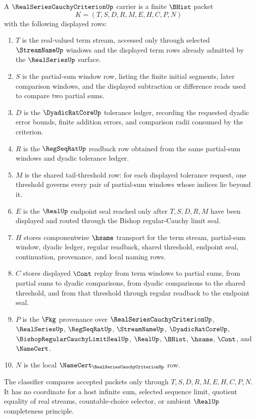 \begin{definition}\label{def:real-series-cauchy-criterion-carrier}
A $\RealSeriesCauchyCriterionUp$ carrier is a finite $\BHist$ packet
$$
K=(T,S,D,R,M,E,H,C,P,N)
$$
with the following displayed rows:
\begin{enumerate}
\item $T$ is the real-valued term stream, accessed only through selected $\StreamNameUp$ windows and the displayed term rows already admitted by the $\RealSeriesUp$ surface.
\item $S$ is the partial-sum window row, listing the finite initial segments, later comparison windows, and the displayed subtraction or difference reads used to compare two partial sums.
\item $D$ is the $\DyadicRatCoreUp$ tolerance ledger, recording the requested dyadic error bounds, finite addition errors, and comparison radii consumed by the criterion.
\item $R$ is the $\RegSeqRatUp$ readback row obtained from the same partial-sum windows and dyadic tolerance ledger.
\item $M$ is the shared tail-threshold row: for each displayed tolerance request, one threshold governs every pair of partial-sum windows whose indices lie beyond it.
\item $E$ is the $\RealUp$ endpoint seal reached only after $T,S,D,R,M$ have been displayed and routed through the Bishop regular-Cauchy limit seal.
\item $H$ stores componentwise $\hsame$ transport for the term stream, partial-sum window, dyadic ledger, regular readback, shared threshold, endpoint seal, continuation, provenance, and local naming rows.
\item $C$ stores displayed $\Cont$ replay from term windows to partial sums, from partial sums to dyadic comparisons, from dyadic comparisons to the shared threshold, and from that threshold through regular readback to the endpoint seal.
\item $P$ is the $\Pkg$ provenance over $\RealSeriesCauchyCriterionUp$, $\RealSeriesUp$, $\RegSeqRatUp$, $\StreamNameUp$, $\DyadicRatCoreUp$, $\BishopRegularCauchyLimitSealUp$, $\RealUp$, $\BHist$, $\hsame$, $\Cont$, and $\NameCert$.
\item $N$ is the local $\NameCert_{\RealSeriesCauchyCriterionUp}$ row.
\end{enumerate}
The classifier compares accepted packets only through $T,S,D,R,M,E,H,C,P,N$. It has no coordinate for a host infinite sum, selected sequence limit, quotient equality of real streams, countable-choice selector, or ambient $\RealUp$ completeness principle.
\end{definition}

